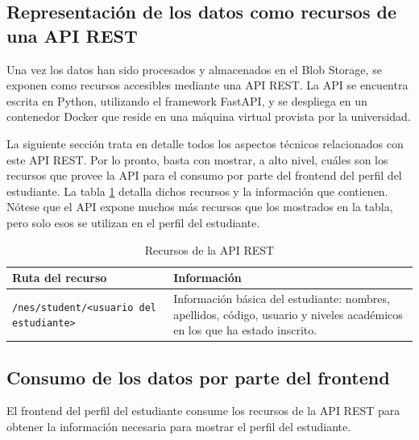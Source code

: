 \subsection{Representación de los datos como recursos de una API REST}

Una vez los datos han sido procesados y almacenados en el Blob Storage, se exponen como recursos accesibles mediante una \gls{API REST}. La \gls{API} se encuentra escrita en Python, utilizando el framework FastAPI, y se despliega en un contenedor Docker que reside en una máquina virtual provista por la universidad. 

La siguiente sección trata en detalle todos los aspectos técnicos relacionados con este \gls{API REST}. Por lo pronto, basta con mostrar, a alto nivel, cuáles son los recursos que provee la \gls{API} para el consumo por parte del frontend del perfil del estudiante. La tabla \ref{tab:recursos} detalla dichos recursos y la información que contienen. Nótese que el \gls{API} expone muchos más recursos que los mostrados en la tabla, pero solo esos se utilizan en el perfil del estudiante.

\begin{table}[h]
  \centering
  \caption{Recursos de la \gls{API REST}}
  \alternatecolors
  \begin{tabular}{p{3cm}p{8cm}}
  \hline
  \textbf{Ruta del recurso} & \textbf{Información} \\
  \hline
  \verb*|/nes/student/<usuario del estudiante>| & Información básica del estudiante: nombres, apellidos, código, usuario y niveles académicos en los que ha estado inscrito. \\
  \hline
  \end{tabular}
  \label{tab:recursos}
\end{table}


\subsection{Consumo de los datos por parte del frontend}

El frontend del perfil del estudiante consume los recursos de la \gls{API REST} para obtener la información necesaria para mostrar el perfil del estudiante. 